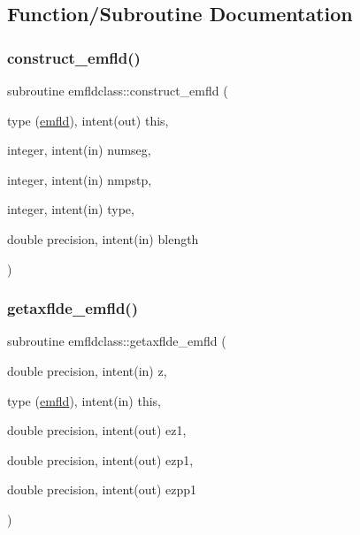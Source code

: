 \subsection{Function/\+Subroutine Documentation}
\mbox{\label{namespaceemfldclass_a2a7e6a32e149f3dc82fbbc59d5c6ec2d}} 
\subsubsection{\texorpdfstring{construct\_emfld()}{construct\_emfld()}}
{\footnotesize\ttfamily subroutine emfldclass\+::construct\+\_\+emfld (\begin{DoxyParamCaption}\item[{type (\mbox{\hyperlink{namespaceemfldclass_structemfldclass_1_1emfld}{emfld}}), intent(out)}]{this,  }\item[{integer, intent(in)}]{numseg,  }\item[{integer, intent(in)}]{nmpstp,  }\item[{integer, intent(in)}]{type,  }\item[{double precision, intent(in)}]{blength }\end{DoxyParamCaption})}

\mbox{\label{namespaceemfldclass_a2b0b3e7b6537f3a6ea857f99288186ef}} 
\subsubsection{\texorpdfstring{getaxflde\_emfld()}{getaxflde\_emfld()}}
{\footnotesize\ttfamily subroutine emfldclass\+::getaxflde\+\_\+emfld (\begin{DoxyParamCaption}\item[{double precision, intent(in)}]{z,  }\item[{type (\mbox{\hyperlink{namespaceemfldclass_structemfldclass_1_1emfld}{emfld}}), intent(in)}]{this,  }\item[{double precision, intent(out)}]{ez1,  }\item[{double precision, intent(out)}]{ezp1,  }\item[{double precision, intent(out)}]{ezpp1 }\end{DoxyParamCaption})}



